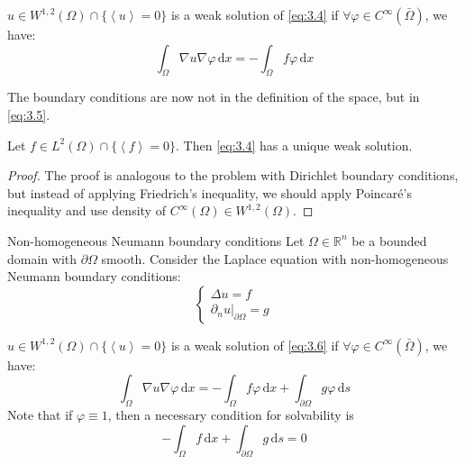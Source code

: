 \documentclass{report}
\begin{document}
\begin{definition}{}{}
    \(u \in W^{1, 2}(\Omega) \cap \{\left\langle u \right\rangle = 0\}\) is a weak solution of \ref{eq:3.4} if \(\forall \varphi \in C^{\infty}(\bar{\Omega})\), we have:
    \begin{equation}\label{eq:3.5}
        \int_{\Omega} \nabla u \nabla \varphi \,\mathrm{d}x = - \int_{\Omega} f \varphi \,\mathrm{d}x
    \end{equation}

\end{definition}

\begin{note}
    The boundary conditions are now not in the definition of the space, but in \ref{eq:3.5}.
\end{note}

\begin{theorem}{}{}
    Let \(f \in L^{2}(\Omega) \cap \{\left\langle f \right\rangle = 0\}\). Then \ref{eq:3.4} has a unique weak solution. 
\end{theorem}

\begin{proof}
    The proof is analogous to the problem with Dirichlet boundary conditions, but instead of applying Friedrich's inequality, we should apply Poincaré's inequality and use density of \(C^{\infty}(\Omega) \in W^{1, 2}(\Omega)\). 
\end{proof}

\begin{example}{Non-homogeneous Neumann boundary conditions}{}
    Let \(\Omega \in \mathbb{R}^{n}\) be a bounded domain with \(\partial \Omega\) smooth. Consider the Laplace equation with non-homogeneous Neumann boundary conditions:
    \begin{equation}\label{eq:3.6}
        \begin{cases}
            \Delta u = f \\
            \left. \partial_{n} u \right|_{\partial \Omega} = g
        \end{cases}
    \end{equation}
\end{example}

\begin{definition}{}{}
    \(u \in W^{1, 2}(\Omega) \cap \{\left\langle u \right\rangle = 0\}\) is a weak solution of \ref{eq:3.6} if \(\forall \varphi \in C^{\infty}(\bar{\Omega})\), we have:
    \begin{equation}\label{eq:3.7}
        \int_{\Omega} \nabla u \nabla \varphi \,\mathrm{d}x = - \int_{\Omega} f \varphi \,\mathrm{d}x + \int_{\partial\Omega} g\varphi \,\mathrm{d}s
    \end{equation}
    Note that if \(\varphi \equiv 1\), then a necessary condition for solvability is
    \[
        - \int_{\Omega} f \,\mathrm{d}x + \int_{\partial\Omega} g \,\mathrm{d}s = 0
    \]
\end{definition}
\end{document}
